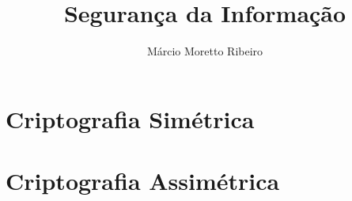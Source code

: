 \documentclass[a4,12pt]{book}
\begin{document}


\author{Márcio Moretto Ribeiro}

\title{Segurança da Informação}

\maketitle

\setcounter{tocdepth}{1} %
\tableofcontents



\part{Criptografia Simétrica}






\part{Criptografia Assimétrica}





\appendix

%
%
%
%
%
%
%


\end{document}

